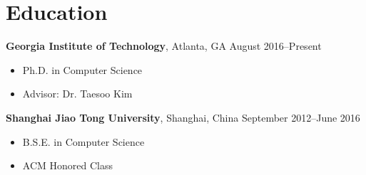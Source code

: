 \section*{Education}

\begin{description}
\item {\bf Georgia Institute of Technology}, Atlanta, GA \dotfill August 2016--Present
  \begin{itemize}
  \item Ph.D. in Computer Science
  \item Advisor: Dr. Taesoo Kim
  \end{itemize}
  
\item {\bf Shanghai Jiao Tong University}, Shanghai, China \dotfill September 2012--June 2016
  \begin{itemize}
  \item B.S.E. in Computer Science
  \item ACM Honored Class
  \end{itemize}

\end{description}
